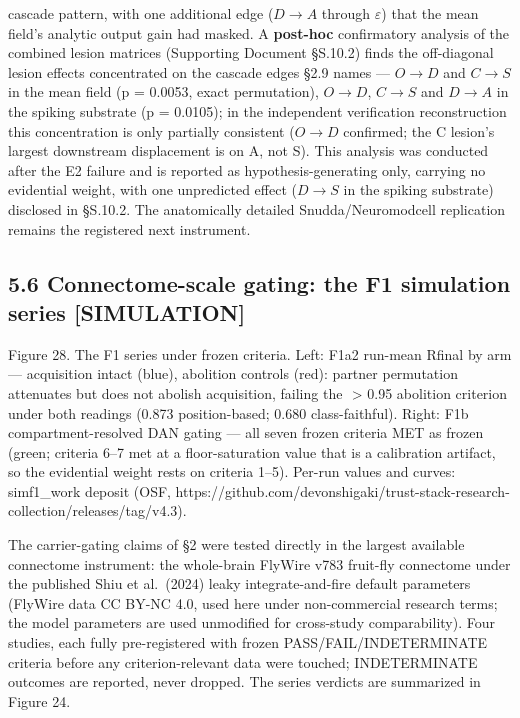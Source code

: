 \documentclass[
]{article}
\begin{document}
cascade pattern, with one additional edge (\(D{\to}A\) through
\(\varepsilon\)) that the mean field's analytic output gain had masked.
A \textbf{post-hoc} confirmatory analysis of the combined lesion
matrices (Supporting Document §S.10.2) finds the off-diagonal lesion
effects concentrated on the cascade edges §2.9 names --- \(O{\to}D\) and
\(C{\to}S\) in the mean field (p = 0.0053, exact permutation),
\(O{\to}D\), \(C{\to}S\) and \(D{\to}A\) in the spiking substrate (p =
0.0105); in the independent verification reconstruction this
concentration is only partially consistent (\(O{\to}D\) confirmed; the C
lesion's largest downstream displacement is on A, not S). This analysis
was conducted after the E2 failure and is reported as
hypothesis-generating only, carrying no evidential weight, with one
unpredicted effect (\(D{\to}S\) in the spiking substrate) disclosed in
§S.10.2. The anatomically detailed Snudda/Neuromodcell replication
remains the registered next instrument.

\subsection{5.6 Connectome-scale gating: the F1 simulation series
{[}SIMULATION{]}}\label{connectome-scale-gating-the-f1-simulation-series-simulation}

Figure 28. The F1 series under frozen criteria. Left: F1a2 run-mean
{Rfinal} by arm --- acquisition intact (blue), abolition controls (red):
partner permutation attenuates but does not abolish acquisition, failing
the { \textgreater{} 0.95} abolition criterion under both readings
(0.873 position-based; 0.680 class-faithful). Right: F1b
compartment-resolved DAN gating --- all seven frozen criteria MET as
frozen (green; criteria 6--7 met at a floor-saturation value that is a
calibration artifact, so the evidential weight rests on criteria 1--5).
Per-run values and curves: simf1\_work deposit (OSF,
https://github.com/devonshigaki/trust-stack-research-collection/releases/tag/v4.3).

The carrier-gating claims of §2 were tested directly in the largest
available connectome instrument: the whole-brain FlyWire v783 fruit-fly
connectome under the published Shiu et al.~(2024) leaky
integrate-and-fire default parameters (FlyWire data CC BY-NC 4.0, used
here under non-commercial research terms; the model parameters are used
unmodified for cross-study comparability). Four studies, each fully
pre-registered with frozen PASS/FAIL/INDETERMINATE criteria before any
criterion-relevant data were touched; INDETERMINATE outcomes are
reported, never dropped. The series verdicts are summarized in Figure
24.
\end{document}
